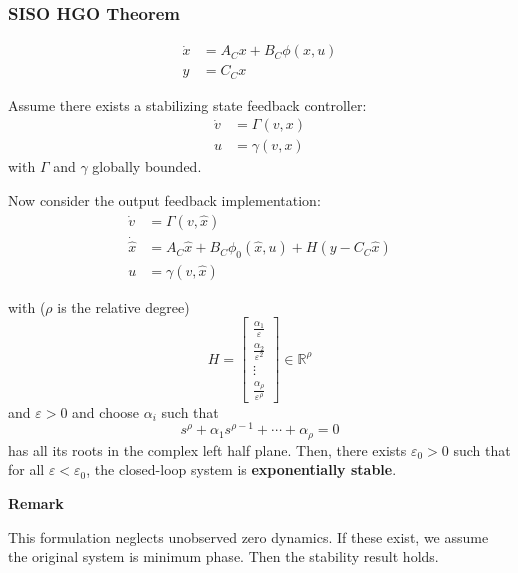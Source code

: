 \subsubsection{SISO HGO Theorem}
\begin{align*}
    \dot{x} & = A_C x + B_C \phi(x, u) \\
    y       & = C_C x
\end{align*}
\newpar{}

Assume there exists a stabilizing state feedback controller:
\begin{align*}
    \dot{v} & = \Gamma(v, x) \\
    u       & = \gamma(v, x)
\end{align*}
with $\Gamma$ and $\gamma$ globally bounded.

Now consider the output feedback implementation:
\begin{align*}
    \dot{v}       & = \Gamma(v, \hat{x})                                        \\
    \dot{\hat{x}} & = A_C \hat{x} + B_C \phi_0(\hat{x}, u) + H(y - C_C \hat{x}) \\
    u             & = \gamma(v, \hat{x})
\end{align*}

with ($\rho$ is the relative degree)
\begin{equation*}
    H =
    \begin{bmatrix}
        \frac{\alpha_1}{\varepsilon}   \\
        \frac{\alpha_2}{\varepsilon^2} \\
        \vdots                         \\
        \frac{\alpha_\rho}{\varepsilon^\rho}
    \end{bmatrix}
    \in \mathbb{R}^\rho
\end{equation*}
and $\varepsilon>0$ and choose $\alpha_i$ such that
\begin{equation*}
    s^\rho + \alpha_1 s^{\rho - 1} + \cdots + \alpha_\rho = 0
\end{equation*}
has all its roots in the complex left half plane.
\newpar{}
Then, there exists $\varepsilon_0 > 0$ such that for all $\varepsilon < \varepsilon_0$, the closed-loop system is \textbf{exponentially stable}.

\newpar{}
\textbf{Remark}

This formulation neglects unobserved zero dynamics. If these exist, we assume the original system is minimum phase. Then the stability result holds.


